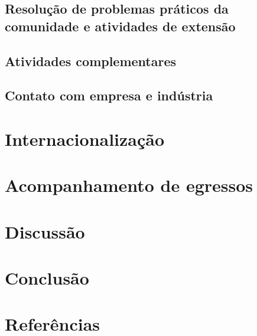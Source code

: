 \subsection{Resolução de problemas práticos da comunidade e atividades de extensão}
\label{ssec:comunidade}


\subsection{Atividades complementares}
\label{ssec:atvcompl}


\subsection{Contato com empresa e indústria}
\label{ssec:empresa}


\section{Internacionalização}
\label{sec:inter}


\section{Acompanhamento de egressos}
\label{sec:egresso}


\section{Discussão}
\label{sec:disc}
%

\section{Conclusão}
\label{sec:conc}
%

\section{Referências}
\label{sec:ref}


